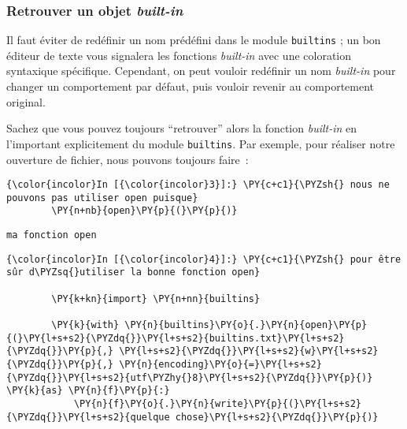    \hypertarget{retrouver-un-objet-built-in}{%
\subsubsection{\texorpdfstring{Retrouver un objet
\emph{built-in}}{Retrouver un objet built-in}}\label{retrouver-un-objet-built-in}}

    Il faut éviter de redéfinir un nom prédéfini dans le module
\texttt{builtins} ; un bon éditeur de texte vous signalera les fonctions
\emph{built-in} avec une coloration syntaxique spécifique. Cependant, on
peut vouloir redéfinir un nom \emph{built-in} pour changer un
comportement par défaut, puis vouloir revenir au comportement original.

Sachez que vous pouvez toujours ``retrouver'' alors la fonction
\emph{built-in} en l'important explicitement du module
\texttt{builtins}. Par exemple, pour réaliser notre ouverture de
fichier, nous pouvons toujours faire~:

    \begin{Verbatim}[commandchars=\\\{\},frame=single,framerule=0.3mm,rulecolor=\color{cellframecolor}]
{\color{incolor}In [{\color{incolor}3}]:} \PY{c+c1}{\PYZsh{} nous ne pouvons pas utiliser open puisque}
        \PY{n+nb}{open}\PY{p}{(}\PY{p}{)}
\end{Verbatim}


    \begin{Verbatim}[commandchars=\\\{\},frame=single,framerule=0.3mm,rulecolor=\color{cellframecolor}]
ma fonction open
\end{Verbatim}

    \begin{Verbatim}[commandchars=\\\{\},frame=single,framerule=0.3mm,rulecolor=\color{cellframecolor}]
{\color{incolor}In [{\color{incolor}4}]:} \PY{c+c1}{\PYZsh{} pour être sûr d\PYZsq{}utiliser la bonne fonction open}
        
        \PY{k+kn}{import} \PY{n+nn}{builtins} 
        
        \PY{k}{with} \PY{n}{builtins}\PY{o}{.}\PY{n}{open}\PY{p}{(}\PY{l+s+s2}{\PYZdq{}}\PY{l+s+s2}{builtins.txt}\PY{l+s+s2}{\PYZdq{}}\PY{p}{,} \PY{l+s+s2}{\PYZdq{}}\PY{l+s+s2}{w}\PY{l+s+s2}{\PYZdq{}}\PY{p}{,} \PY{n}{encoding}\PY{o}{=}\PY{l+s+s2}{\PYZdq{}}\PY{l+s+s2}{utf\PYZhy{}8}\PY{l+s+s2}{\PYZdq{}}\PY{p}{)} \PY{k}{as} \PY{n}{f}\PY{p}{:}
            \PY{n}{f}\PY{o}{.}\PY{n}{write}\PY{p}{(}\PY{l+s+s2}{\PYZdq{}}\PY{l+s+s2}{quelque chose}\PY{l+s+s2}{\PYZdq{}}\PY{p}{)}
\end{Verbatim}


